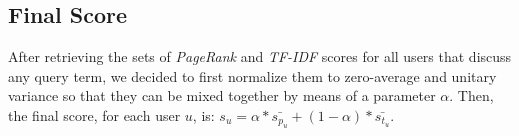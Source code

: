 \subsection{Final Score}

After retrieving the sets of \emph{PageRank} and \emph{TF-IDF} scores for all users that discuss any query term, we decided to first normalize them to zero-average and unitary variance so that they can be mixed together by means of a parameter $\alpha$. Then, the final score, for each user $u$, is: $s_{u} = \alpha * \bar{s_{p_{u}}} + (1 - \alpha) * \bar{s_{t_{u}}}$.